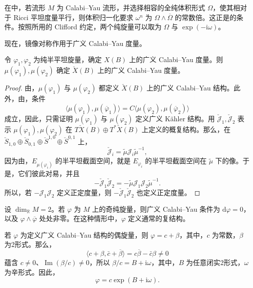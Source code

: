 \begin{example}\label{ex:6.44}
在中，若流形 $M$ 为 Calabi--Yau 流形，并选择相容的全纯体积形式 $\Omega$，使其相对于 Ricci 平坦度量平行，则体积归一化要求 $\omega^n$ 为 $\Omega\wedge\overline\Omega$ 的常数倍。这正是的条件。按照所用的 Clifford 约定，两个纯旋量可以取为 $\Omega$ 与 $\exp(-\mathrm i\omega)$。
\end{example}

现在，镜像对称作用于广义 Calabi--Yau 度量。

\begin{theorem}\label{thm:6.45}
令 $\varphi_1,\varphi_2$ 为纯半平坦旋量，确定 $X(B)$ 上的广义 Calabi--Yau 度量。则 $\mu(\varphi_1),\mu(\varphi_2)$ 确定 $\check X(B)$ 上的广义 Calabi--Yau 度量。
\end{theorem}
\begin{proof}
由，$\mu(\varphi_1)$ 与 $\mu(\varphi_2)$ 都定义 $\check X(B)$ 上的广义 Calabi--Yau 结构。此外，由，条件
\[
\langle\mu(\varphi_1),\mu(\overline\varphi_1)\rangle
=C\langle\mu(\varphi_2),\mu(\overline\varphi_2)\rangle
\]
成立，因此，只需证明 $\mu(\varphi_1)$ 与 $\mu(\varphi_2)$ 定义广义 Kähler 结构。用 $\check{\mathcal J}_1,\check{\mathcal J}_2$ 表示 $\mu(\varphi_1),\mu(\varphi_2)$ 在 $T\check X(B)\oplus T^*\check X(B)$ 上定义的概复结构。那么，在 $\check S_{1,0}\oplus\check S_{0,1}\oplus\check S^{1,0}\oplus\check S^{0,1}$ 上，
\[
\check{\mathcal J}_i=\widetilde\mu\mathcal J_i\widetilde\mu^{-1},
\]
因为由，$E_{\mu(\varphi_i)}$ 的半平坦截面空间，就是 $E_{\varphi_i}$ 的半平坦截面空间在 $\widetilde\mu$ 下的像。于是，它们彼此对易，并且
\[
-\check{\mathcal J}_1\check{\mathcal J}_2
=-\widetilde\mu\mathcal J_1\mathcal J_2\widetilde\mu^{-1}.
\]
所以，若 $-\mathcal J_1\mathcal J_2$ 定义正定度量，则 $-\check{\mathcal J}_1\check{\mathcal J}_2$ 也定义正定度量。
\end{proof}

\begin{example}\label{ex:6.46}
设 $\dim_{\mathbb R}M=2$。若 $\varphi$ 为 $M$ 上的奇纯旋量，则广义 Calabi--Yau 条件为 $\mathrm d\varphi=0$，以及 $\varphi\wedge\overline\varphi$ 处处非零。在这种情形中，$\varphi$ 定义通常的复结构。

若 $\varphi$ 为定义广义 Calabi--Yau 结构的偶旋量，则 $\varphi=c+\beta$，其中，$c$ 为常数，$\beta$ 为2形式。那么，
\[
\langle c+\beta,\bar c+\overline\beta\rangle
=c\overline\beta-\bar c\beta\ne0
\]
蕴含 $c\ne0$、$\operatorname{Im}(\beta/c)\ne0$，所以 $\beta/c=B+\mathrm i\omega$，其中，$B$ 为任意闭实2形式，$\omega$ 为辛形式。因此，
\[
\varphi=c\exp(B+\mathrm i\omega).
\]
\end{example}

